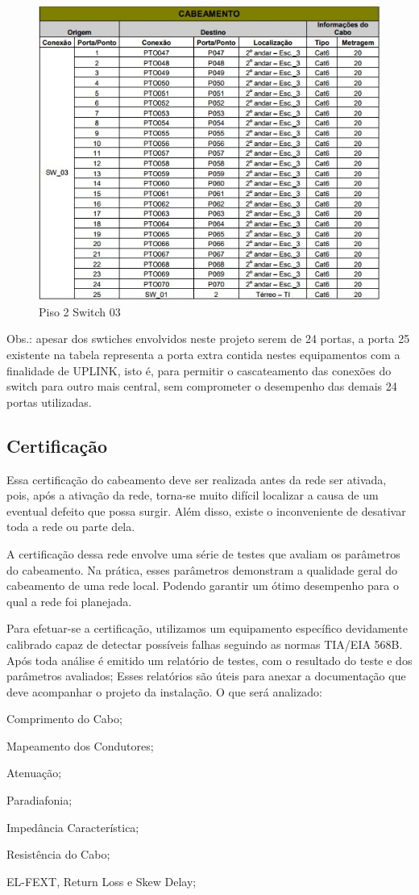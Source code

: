 \documentclass[	DIV=calc,%
							paper=a4,%
							fontsize=12pt,%
							onecolumn]{scrartcl}	 					%
\begin{document}
\begin{figure}[H]
  \centering
  \includegraphics[width=\textwidth]{sw-03} 
  \caption{Piso 2 Switch 03}
  \label{fig:methodology}
\end{figure}

{\raggedright Obs.: apesar dos swtiches envolvidos neste projeto serem de 24 portas, a porta 25 existente
na tabela representa a porta extra contida nestes equipamentos com a finalidade de UPLINK, isto
é, para permitir o cascateamento das conexões do switch para outro mais central, sem comprometer o desempenho das demais 24 portas utilizadas. 
}
\subsection{Certificação}

{\raggedright  Essa certificação do cabeamento deve ser realizada antes da rede ser ativada, pois, após a ativação da rede, torna-se muito difícil localizar a causa de um eventual defeito que possa surgir. Além disso, existe o inconveniente de desativar toda a rede ou parte dela.

A certificação dessa rede envolve uma série de testes que avaliam os parâmetros do cabeamento. Na prática, esses parâmetros demonstram a qualidade geral do cabeamento de uma rede local. Podendo garantir um ótimo desempenho para o qual a rede foi planejada.

Para efetuar-se a certificação, utilizamos um equipamento específico devidamente calibrado capaz de detectar possíveis falhas seguindo as normas TIA/EIA 568B. Após toda análise é emitido um relatório de testes, com o resultado do teste e dos parâmetros avaliados; Esses relatórios são úteis para anexar a documentação que deve acompanhar o projeto da instalação. 
O que será analizado:

Comprimento do Cabo;

Mapeamento dos Condutores;

Atenuação;

Paradiafonia;

Impedância Característica;

Resistência do Cabo;

EL-FEXT, Return Loss e Skew Delay;

}
\end{document}
